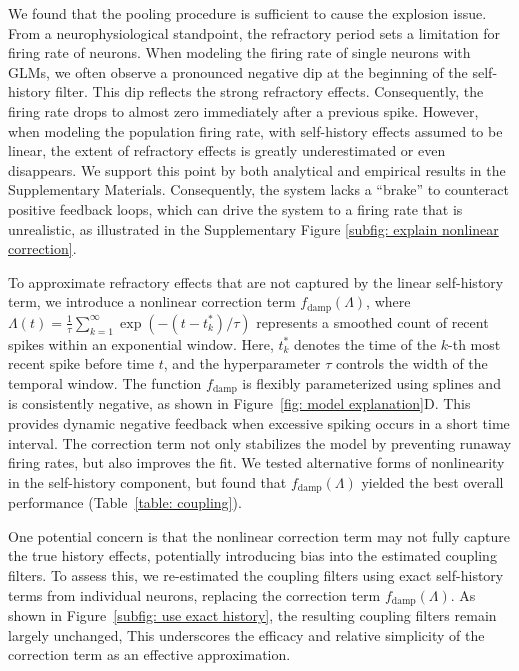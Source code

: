 \documentclass[12pt]{article}
\begin{document}
We found that the pooling procedure is sufficient to cause the explosion issue. From a neurophysiological standpoint, the refractory period sets a limitation for firing rate of neurons. When modeling the firing rate of single neurons with GLMs, we often observe a pronounced negative dip at the beginning of the self-history filter. This dip reflects the strong refractory effects. Consequently, the firing rate drops to almost zero immediately after a previous spike. However, when modeling the population firing rate, with self-history effects assumed to be linear, the extent of refractory effects is greatly underestimated or even disappears. We support this point by both analytical and empirical results in the Supplementary Materials. Consequently, the system lacks a ``brake'' to counteract positive feedback loops, which can drive the system to a firing rate that is unrealistic, as illustrated in the Supplementary Figure \ref{subfig: explain nonlinear correction}.

To approximate refractory effects that are not captured by the linear self-history term, we introduce a nonlinear correction term $f_{\text{damp}}(\Lambda)$, where $\Lambda(t) = \frac{1}{\tau} \sum_{k=1}^\infty \exp(-(t - t_k^*) / \tau)$ represents a smoothed count of recent spikes within an exponential window. Here, $t_k^*$ denotes the time of the $k$-th most recent spike before time $t$, and the hyperparameter $\tau$ controls the width of the temporal window. The function $f_{\text{damp}}$ is flexibly parameterized using splines and is consistently negative, as shown in Figure~\ref{fig: model explanation}D. This provides dynamic negative feedback when excessive spiking occurs in a short time interval. The correction term not only stabilizes the model by preventing runaway firing rates, but also improves the fit. We tested alternative forms of nonlinearity in the self-history component, but found that $f_{\text{damp}}(\Lambda)$ yielded the best overall performance (Table~\ref{table: coupling}).

One potential concern is that the nonlinear correction term may not fully capture the true history effects, potentially introducing bias into the estimated coupling filters. To assess this, we re-estimated the coupling filters using exact self-history terms from individual neurons, replacing the correction term $f_{\text{damp}}(\Lambda)$. As shown in Figure~\ref{subfig: use exact history}, the resulting coupling filters remain largely unchanged, This underscores the efficacy and relative simplicity of the correction term as an effective approximation.
\end{document}
